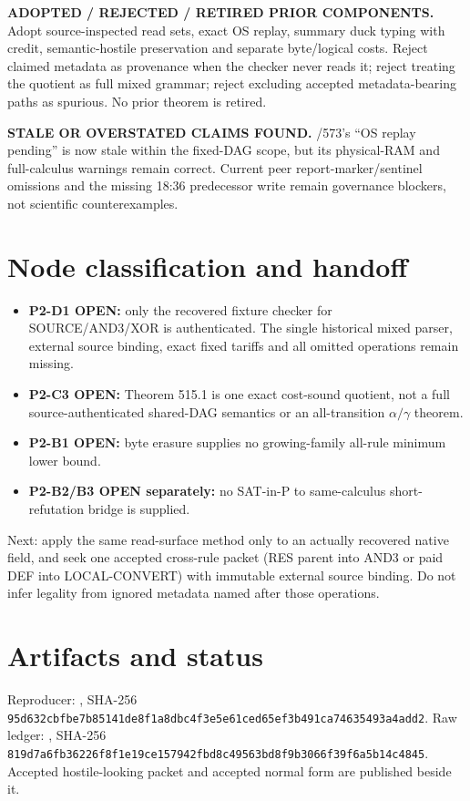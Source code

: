 \documentclass[11pt]{article}
\begin{document}
\textbf{ADOPTED / REJECTED / RETIRED PRIOR COMPONENTS.}  Adopt source-inspected read sets, exact OS replay, summary duck typing with credit, semantic-hostile preservation and separate byte/logical costs.  Reject claimed metadata as provenance when the checker never reads it; reject treating the quotient as full mixed grammar; reject excluding accepted metadata-bearing paths as spurious.  No prior theorem is retired.

\textbf{STALE OR OVERSTATED CLAIMS FOUND.}  /573's ``OS replay pending'' is now stale within the fixed-DAG scope, but its physical-RAM and full-calculus warnings remain correct.  Current peer report-marker/sentinel omissions and the missing 18:36 predecessor write remain governance blockers, not scientific counterexamples.

\section*{Node classification and handoff}
\begin{itemize}
\item \textbf{P2-D1 OPEN:} only the recovered fixture checker for SOURCE/AND3/XOR is authenticated.  The single historical mixed parser, external source binding, exact fixed tariffs and all omitted operations remain missing.
\item \textbf{P2-C3 OPEN:} Theorem 515.1 is one exact cost-sound quotient, not a full source-authenticated shared-DAG semantics or an all-transition $\alpha/\gamma$ theorem.
\item \textbf{P2-B1 OPEN:} byte erasure supplies no growing-family all-rule minimum lower bound.
\item \textbf{P2-B2/B3 OPEN separately:} no SAT-in-P to same-calculus short-refutation bridge is supplied.
\end{itemize}

Next: apply the same read-surface method only to an actually recovered native field, and seek one accepted cross-rule packet (RES parent into AND3 or paid DEF into LOCAL-CONVERT) with immutable external source binding.  Do not infer legality from ignored metadata named after those operations.

\section*{Artifacts and status}
Reproducer: , SHA-256 \texttt{95d632cbfbe7b85141de8f1a8dbc4f3e5e61ced65ef3b491ca74635493a4add2}.  Raw ledger: , SHA-256 \texttt{819d7a6fb36226f8f1e19ce157942fbd8c49563bd8f9b3066f39f6a5b14c4845}.  Accepted hostile-looking packet and accepted normal form are published beside it.
\end{document}
